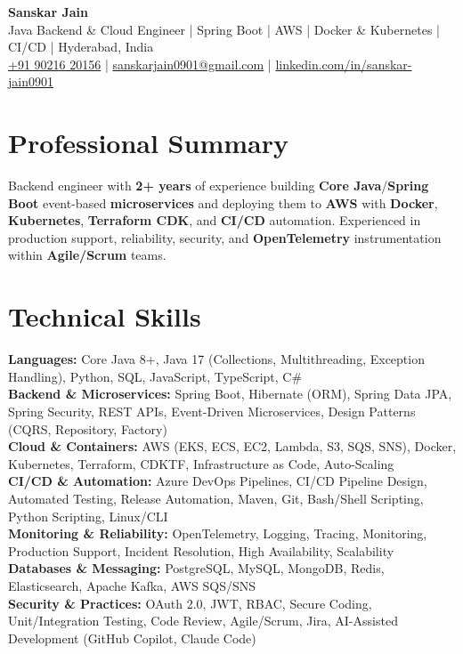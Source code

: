 \documentclass[a4paper,10pt]{article}
\begin{document}
\begin{center}
    {\LARGE \textbf{Sanskar Jain}} \\
    \vspace{2pt}
    Java Backend \& Cloud Engineer \;|\; Spring Boot \;|\; AWS \;|\; Docker \& Kubernetes \;|\; CI/CD \;|\; Hyderabad, India \\
    \vspace{2pt}
    \href{tel:+919021620156}{+91 90216 20156} \;|\;
    \href{mailto:sanskarjain0901@gmail.com}{sanskarjain0901@gmail.com} \;|\;
    \href{https://www.linkedin.com/in/sanskar-jain0901/}{linkedin.com/in/sanskar-jain0901}
\end{center}

\section*{Professional Summary}
Backend engineer with \textbf{2+ years} of experience building \textbf{Core Java}/\textbf{Spring Boot} event-based \textbf{microservices} and deploying them to \textbf{AWS} with \textbf{Docker}, \textbf{Kubernetes}, \textbf{Terraform CDK}, and \textbf{CI/CD} automation.
Experienced in production support, reliability, security, and \textbf{OpenTelemetry} instrumentation within \textbf{Agile/Scrum} teams.

\section*{Technical Skills}
\begin{sloppypar}
\noindent
\textbf{Languages:} Core Java 8+, Java 17 (Collections, Multithreading, Exception Handling), Python, SQL, JavaScript, TypeScript, C\# \\
\textbf{Backend \& Microservices:} Spring Boot, Hibernate (ORM), Spring Data JPA, Spring Security, REST APIs, Event-Driven Microservices, Design Patterns (CQRS, Repository, Factory) \\
\textbf{Cloud \& Containers:} AWS (EKS, ECS, EC2, Lambda, S3, SQS, SNS), Docker, Kubernetes, Terraform, CDKTF, Infrastructure as Code, Auto-Scaling \\
\textbf{CI/CD \& Automation:} Azure DevOps Pipelines, CI/CD Pipeline Design, Automated Testing, Release Automation, Maven, Git, Bash/Shell Scripting, Python Scripting, Linux/CLI \\
\textbf{Monitoring \& Reliability:} OpenTelemetry, Logging, Tracing, Monitoring, Production Support, Incident Resolution, High Availability, Scalability \\
\textbf{Databases \& Messaging:} PostgreSQL, MySQL, MongoDB, Redis, Elasticsearch, Apache Kafka, AWS SQS/SNS \\
\textbf{Security \& Practices:} OAuth 2.0, JWT, RBAC, Secure Coding, Unit/Integration Testing, Code Review, Agile/Scrum, Jira, AI-Assisted Development (GitHub Copilot, Claude Code)
\end{sloppypar}
\end{document}
